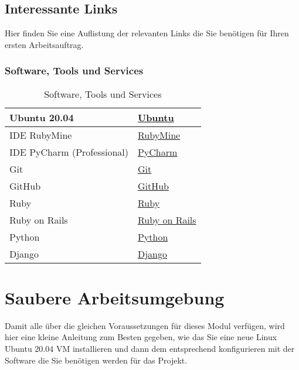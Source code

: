 \subsection{Interessante Links}\label{subsec:links}
\begin{frame}[fragile]
    Hier finden Sie eine Auflistung der relevanten Links die Sie benötigen für Ihren ersten Arbeitsauftrag.
\end{frame}


\begin{frame}[fragile]
    \frametitle<presentation>{Software, Tools und Services}
    \begin{table}[h!]
        \centering
        \begin{tabularx}{0.8\textwidth} {
        | >{\raggedright\arraybackslash}X
        | >{\raggedright\arraybackslash}X | }
            \hline
            Ubuntu 20.04 & \href{https://ubuntu.com/}{Ubuntu} \\
            \hline
            IDE RubyMine & \href{https://www.jetbrains.com/de-de/ruby/}{RubyMine} \\
            \hline
            IDE PyCharm (Professional) & \href{https://www.jetbrains.com/de-de/pycharm/}{PyCharm} \\
            \hline
            Git & \href{https://git-scm.com/}{Git} \\
            \hline
            GitHub & \href{https://github.com/}{GitHub} \\
            \hline
            Ruby & \href{https://www.ruby-lang.org/de/}{Ruby} \\
            \hline
            Ruby on Rails & \href{https://guides.rubyonrails.org/index.html}{Ruby on Rails} \\
            \hline
            Python & \href{https://www.python.org/}{Python} \\
            \hline
            Django & \href{https://www.djangoproject.com/}{Django} \\
            \hline
        \end{tabularx}
        \caption{Software, Tools und Services}
        \label{tab:2}
    \end{table}
\end{frame}




\section{Saubere Arbeitsumgebung}\label{sec:sauber}
\begin{frame}[fragile]
    Damit alle über die gleichen Voraussetzungen für dieses Modul verfügen, wird hier eine kleine Anleitung zum
    Besten gegeben, wie das Sie eine neue Linux Ubuntu 20.04 VM installieren und dann dem entsprechend konfigurieren
    mit der Software die Sie benötigen werden für das Projekt.
\end{frame}


